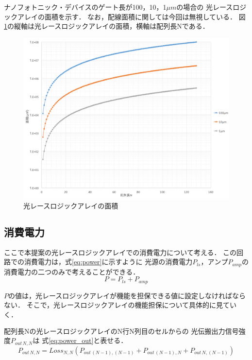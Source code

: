 ナノフォトニック・デバイスのゲート長が100，10，1$\mu m$の場合の
光レースロジックアレイの面積を示す．
なお，配線面積に関しては今回は無視している．
図\ref{fig:nanoArea}の縦軸は光レースロジックアレイの面積，横軸は配列長Nである．
\begin{figure}[t!]
\begin{center}
\includegraphics[keepaspectratio,scale=0.5]{fig/4/nanoArea.png}
\caption{光レースロジックアレイの面積}
\label{fig:nanoArea}
\end{center}
\end{figure}

\subsection{消費電力}
ここで本提案の光レースロジックアレイでの消費電力について考える．
この回路での消費電力は，式\ref{eq:power}に示すように
$光源の消費電力P_{ls}$，$アンプP_{amp}$の消費電力の二つのみで考えることができる．
\begin{equation}
P=P_{ls}+P_{amp}
\label{eq:power}
\end{equation}

$P$の値は，光レースロジックアレイが機能を担保できる値に設定しなければならない．
そこで，光レースロジックアレイの機能担保について具体的に見ていく．

配列長Nの光レースロジックアレイのN行N列目のセルからの
光伝搬出力信号強度$P_{out\,N,N}$は
式\ref{eq:power_out}と表せる．
\begin{equation}
P_{out\,N,N}=Loss_{N,N}(P_{out\,(N-1),(N-1)}+P_{out\,(N-1),N}+P_{out\,N,(N-1)})
\label{eq:power_out}
\end{equation}

